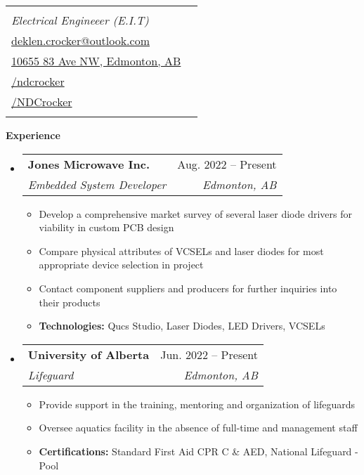 \documentclass[letterpaper,12pt]{article}[leftmargin=*]
\makeatletter
\def \fullname {Nicolas Deklen Crocker}
\def \subtitle {Electrical Engineeer (E.I.T)}
\def \linkedinicon {\faLinkedin}
\def \linkedinlink {https://linkedin.com/in/ndcrocker/}
\def \linkedintext {/ndcrocker}
\def \phoneicon {\faPhone}
\def \phonetext {+1 (825) 333-4907}
\def \emailicon {\faEnvelope}
\def \emaillink {mailto:deklen.crocker@outlook.com}
\def \emailtext {deklen.crocker@outlook.com}
\def \githubicon {\faGithub}
\def \githublink {https://github.com/NDCrocker}
\def \githubtext {/NDCrocker}
\def \addyicon {\faHome}
\def \addylink {https://goo.gl/maps/KHCJbwCxgCt38gPK7} %
\def \addytext {10655 83 Ave NW, Edmonton, AB}
\def \headertype {\singlecol} %
\def \entryspacing {-0pt}
\def \linkedin {\linkedinicon \hspace{3pt}\href{\linkedinlink}{\linkedintext}}
\def \phone {\phoneicon \hspace{3pt}{ \phonetext}}
\def \email {\emailicon \hspace{3pt}\href{\emaillink}{\emailtext}}
\def \github {\githubicon \hspace{3pt}\href{\githublink}{\githubtext}}
\def \addy {\addyicon \hspace{3pt}\href{\addylink}{\addytext}}
\renewcommand{\section}[2]{\vspace{5pt}
  \colorbox{secondary}{\color{white}\raggedbottom\normalsize\textbf{{#1}{\hspace{7pt}#2}}}
}
\newcommand{\resumeEntryStart}{\begin{itemize}[leftmargin=2.5mm]}
\newcommand{\resumeEntryEnd}{\end{itemize}\vspace{\entryspacing}}
\newcommand{\resumeItemListStart}{\begin{itemize}[leftmargin=4.5mm]}
\newcommand{\resumeItemListEnd}{\end{itemize}}
\newcommand{\resumeItem}[1]{
  \item\small{
    {#1 \vspace{-2pt}}
  }
}
\newcommand{\resumeEntryTSDL}[4]{
  \vspace{-1pt}\item[]
    \begin{tabularx}{0.97\textwidth}{X@{\hspace{60pt}}r}
      \textbf{\color{primary}#1} & {\firabook\color{accent}\small#2} \\
      \textit{\color{accent}\small#3} & \textit{\color{accent}\small#4} \\
    \end{tabularx}\vspace{-6pt}
}
\newcommand{\doublecol}[6]{
  \begin{tabularx}{\textwidth}{Xr}
    {
      \begin{tabular}[c]{l}
        \fontsize{35}{45}\selectfont{\color{primary}{{\textbf{\fullname}}}} \\
        {\textit{\subtitle}} %
      \end{tabular}
    } & {
      \begin{tabular}[c]{l@{\hspace{1.5em}}l}
        {\small#4} & {\small#1} \\
        {\small#5} & {\small#2} \\
        {\small#6} & {\small#3}
      \end{tabular}
    }
  \end{tabularx}
}
\newcommand{\singlecol}[6]{
  \begin{tabularx}{\textwidth}{Xr}
    {
      \begin{tabular}[b]{l}
        \fontsize{35}{45}\selectfont{\color{primary}{{\textbf{\fullname}}}} \\
        {\textit{\subtitle}} %
      \end{tabular}
    } & {
      \begin{tabular}[c]{l}
        {\small#1} \\
        {\small#2} \\
        {\small#3} \\
        {\small#4} \\
        {\small#5} \\
        {\small#6}
      \end{tabular}
    }
  \end{tabularx}
}
\makeatother
\begin{document}


\headertype{\phone}{\email}{\addy}{\linkedin}{\github}{} %
\vspace{-25pt} %

\section{\faPieChart}{Experience}

  \resumeEntryStart
    \resumeEntryTSDL
      {Jones Microwave Inc.}{Aug. 2022 -- Present}
      {Embedded System Developer}{Edmonton, AB}
    \resumeItemListStart
      \resumeItem {Develop a comprehensive market survey of several laser diode drivers for viability in custom PCB design}
      \resumeItem {Compare physical attributes of VCSELs and laser diodes for most appropriate device selection in project}
      \resumeItem {Contact component suppliers and producers for further inquiries into their products}
      \resumeItem {\textbf{Technologies:} Qucs Studio, Laser Diodes, LED Drivers, VCSELs}
    \resumeItemListEnd
  \resumeEntryEnd

  \resumeEntryStart
  \resumeEntryTSDL
  {University of Alberta}{Jun. 2022 -- Present}
  {Lifeguard}{Edmonton, AB}
      \resumeItemListStart
      \resumeItem {Provide support in the training, mentoring and organization of lifeguards}
      \resumeItem {Oversee aquatics facility in the absence of full-time and management staff}
      \resumeItem {\textbf{Certifications:} Standard First Aid CPR C \& AED, National Lifeguard - Pool}
    \resumeItemListEnd
  \resumeEntryEnd

\end{document}
